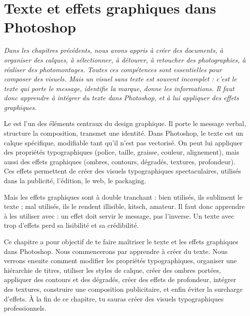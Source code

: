 
\chapter{Texte et effets graphiques dans Photoshop}

\noindent
\textit{Dans les chapitres précédents, nous avons appris à créer des documents, à organiser des calques, à sélectionner, à détourer, à retoucher des photographies, à réaliser des photomontages. Toutes ces compétences sont essentielles pour composer des visuels. Mais un visuel sans texte est souvent incomplet : c'est le texte qui porte le message, identifie la marque, donne les informations. Il faut donc apprendre à intégrer du texte dans Photoshop, et à lui appliquer des effets graphiques.}

\vspace{1em}

\noindent
Le  est l'un des éléments centraux du design graphique. Il porte le message verbal, structure la composition, transmet une identité. Dans Photoshop, le texte est un calque spécifique, modifiable tant qu'il n'est pas vectorisé. On peut lui appliquer des propriétés typographiques (police, taille, graisse, couleur, alignement), mais aussi des effets graphiques (ombres, contours, dégradés, textures, profondeur). Ces effets permettent de créer des visuels typographiques spectaculaires, utilisés dans la publicité, l'édition, le web, le packaging.

\vspace{1em}

\noindent
Mais les effets graphiques sont à double tranchant : bien utilisés, ils subliment le texte ; mal utilisés, ils le rendent illisible, kitsch, amateur. Il faut donc apprendre à les utiliser avec  : un effet doit servir le message, pas l'inverse. Un texte avec trop d'effets perd sa lisibilité et sa crédibilité.

\vspace{1em}

\noindent
Ce chapitre a pour objectif de te faire maîtriser le texte et les effets graphiques dans Photoshop. Nous commencerons par apprendre à créer du texte. Nous verrons ensuite comment modifier les propriétés typographiques, organiser une hiérarchie de titres, utiliser les styles de calque, créer des ombres portées, appliquer des contours et des dégradés, créer des effets de profondeur, intégrer des textures, construire une composition publicitaire, et enfin éviter la surcharge d'effets. À la fin de ce chapitre, tu sauras créer des visuels typographiques professionnels.

